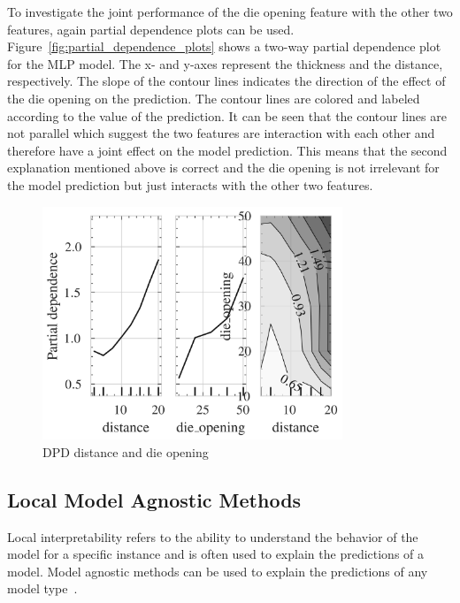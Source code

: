 To investigate the joint performance of the die opening feature with the other two features,
again partial dependence plots can be used.
Figure~\ref{fig:partial_dependence_plots} shows a two-way partial dependence plot for the
\ac{MLP} model.
The x- and y-axes represent the thickness and the distance, respectively.
The slope of the contour lines indicates the direction of the effect of the die opening on the
prediction.
The contour lines are colored and labeled according to the value of the prediction.
It can be seen that the contour lines are not parallel which suggest the two features are
interaction with each other and therefore have a joint effect on the model prediction.
This means that the second explanation mentioned above is correct and the die opening is not irrelevant for the model
prediction but just interacts with the other two features.

\begin{figure}[h]
    \begin{tcolorbox}[arc=0pt,boxrule=0.5pt]
        \centering
        \includegraphics[width=0.8\textwidth]{chap5/images/pdp_distance_die_opening}
    \end{tcolorbox}
    \caption{DPD distance and die opening}
    \label{fig:dpd-distance-die-opening}
\end{figure}

\subsection{Local Model Agnostic Methods}\label{subsec:local-model-agnostic-methods}
Local interpretability refers to the ability to understand the behavior of the model for a
specific instance and is often used to explain the predictions of a model.
Model agnostic methods can be used to explain the predictions of any model type~\cite{molnar2020interpretable}.

